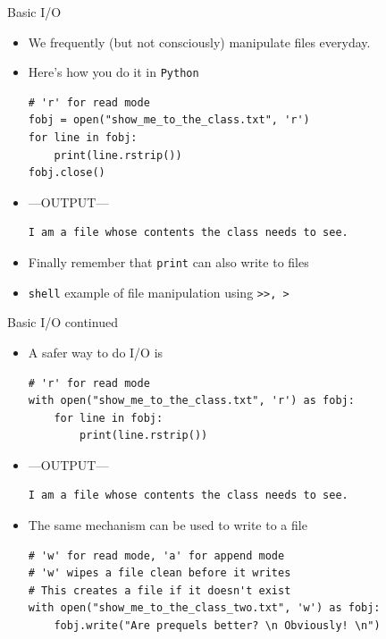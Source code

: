 \documentclass[presentation]{beamer}
\begin{document}
\begin{frame}[label={sec:orgcf47281},fragile]{Basic I/O}
 \begin{itemize}
\item We frequently (but not consciously) manipulate files everyday.
\item Here's how you do it in \texttt{Python}
\footnotesize
\begin{verbatim}
# 'r' for read mode
fobj = open("show_me_to_the_class.txt", 'r')
for line in fobj:
    print(line.rstrip())
fobj.close()
\end{verbatim}

\item ---OUTPUT---
\begin{verbatim}
I am a file whose contents the class needs to see.
\end{verbatim}
\end{itemize}


\begin{itemize}
\item Finally remember that \texttt{print} can also write to files
\item \texttt{shell} example of file manipulation using \texttt{>>, >}
\end{itemize}
\end{frame}
\begin{frame}[label={sec:org7f1b823},fragile]{Basic I/O continued}
 \begin{itemize}
\item A safer way to do I/O is
\footnotesize
\begin{verbatim}
# 'r' for read mode
with open("show_me_to_the_class.txt", 'r') as fobj:
    for line in fobj:
        print(line.rstrip())
\end{verbatim}

\item ---OUTPUT---
\begin{verbatim}
I am a file whose contents the class needs to see.
\end{verbatim}
\end{itemize}


\begin{itemize}
\item The same mechanism can be used to write to a file
\footnotesize
\begin{verbatim}
# 'w' for read mode, 'a' for append mode
# 'w' wipes a file clean before it writes
# This creates a file if it doesn't exist
with open("show_me_to_the_class_two.txt", 'w') as fobj:
    fobj.write("Are prequels better? \n Obviously! \n")
\end{verbatim}
\end{itemize}
\end{frame}
\end{document}
